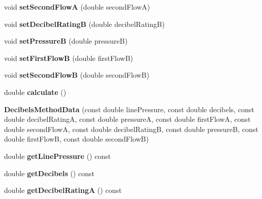 \begin{DoxyCompactItemize}
void {\bfseries set\+Second\+FlowA} (double second\+FlowA)
\item 
\mbox{\label{class_decibels_method_data_addb98fc793dec7fe7d789b3f56582a7d}} 
void {\bfseries set\+Decibel\+RatingB} (double decibel\+RatingB)
\item 
\mbox{\label{class_decibels_method_data_a553e41bdd398e74031b899178348afd3}} 
void {\bfseries set\+PressureB} (double pressureB)
\item 
\mbox{\label{class_decibels_method_data_a00d9e5948d8ec010fc141b4939c565a2}} 
void {\bfseries set\+First\+FlowB} (double first\+FlowB)
\item 
\mbox{\label{class_decibels_method_data_a061d9c83fcdc4b9f50d9ba0fb21777f7}} 
void {\bfseries set\+Second\+FlowB} (double second\+FlowB)
\item 
\mbox{\label{class_decibels_method_data_af76c41c665ccd27190eda48f3874ade1}} 
double {\bfseries calculate} ()
\item 
\mbox{\label{class_decibels_method_data_a7c482e723ee17a137b7f120e1b942e3e}} 
{\bfseries Decibels\+Method\+Data} (const double line\+Pressure, const double decibels, const double decibel\+RatingA, const double pressureA, const double first\+FlowA, const double second\+FlowA, const double decibel\+RatingB, const double pressureB, const double first\+FlowB, const double second\+FlowB)
\item 
\mbox{\label{class_decibels_method_data_a329863849958d0604ff628cbc12160b9}} 
double {\bfseries get\+Line\+Pressure} () const
\item 
\mbox{\label{class_decibels_method_data_a58fdf6f9852ac552623fddc31f1bf2f7}} 
double {\bfseries get\+Decibels} () const
\item 
\mbox{\label{class_decibels_method_data_a9eef52f267377c5ab399babff216c3e6}} 
double {\bfseries get\+Decibel\+RatingA} () const
\item 

\end{DoxyCompactItemize}

